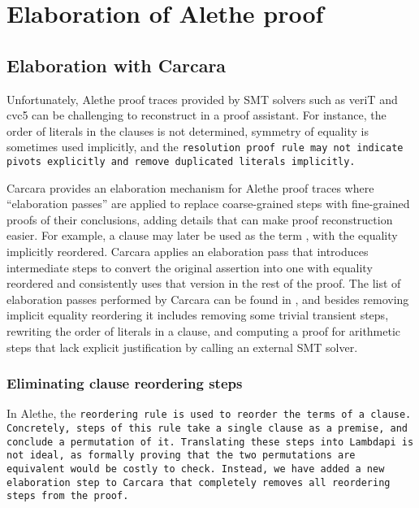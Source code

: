 \chapter{Elaboration of Alethe proof}\label{ch:elab}

\section{Elaboration with Carcara}
\label{sect:elaboration}

Unfortunately, Alethe proof traces provided by SMT solvers such as veriT and cvc5 can be challenging to reconstruct in a proof assistant.
For instance, the order of literals in the clauses is not determined, symmetry
of equality is sometimes used implicitly, and the \tt{resolution} proof rule
may not indicate pivots explicitly and remove duplicated literals implicitly.

Carcara provides an elaboration mechanism for Alethe proof traces where
``elaboration passes'' are applied to replace coarse-grained steps with
fine-grained proofs of their conclusions, adding details that can make proof
reconstruction easier.
%
For example, a clause  may later be used as the term , with the equality  implicitly reordered.
%
Carcara applies an elaboration pass that introduces intermediate steps to convert the original assertion into one with equality reordered and consistently uses that version in the rest of the proof.
%
The list of elaboration passes performed by Carcara can be found in \cite[\S
3.2]{carcara}, and besides removing implicit equality reordering it includes
removing some trivial transient steps, rewriting the order of literals in a
clause, and computing a proof for arithmetic steps that lack explicit justification by calling an
external SMT solver.

\subsection{Eliminating clause reordering steps}
\label{ssec:elabration-reordering}

In Alethe, the \tt{reordering} rule is used to reorder the terms of a clause. Concretely, steps of this rule take a single clause as a premise, and conclude a permutation of it.
Translating these steps into Lambdapi is not ideal, as formally proving that the two permutations are equivalent would be costly to check.
Instead, we have added a new elaboration step to Carcara that completely removes all \tt{reordering} steps from the proof.

